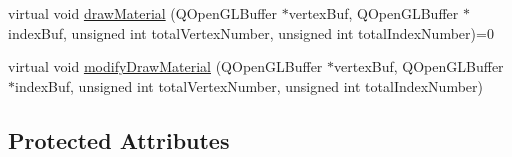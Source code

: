 \begin{DoxyCompactItemize}
\item 
virtual void \mbox{\hyperlink{class_geometry_engine_1_1_geometry_material_1_1_material_a0070eab6e5fe86dc05dc69f2e37b9072}{draw\+Material}} (Q\+Open\+G\+L\+Buffer $\ast$vertex\+Buf, Q\+Open\+G\+L\+Buffer $\ast$index\+Buf, unsigned int total\+Vertex\+Number, unsigned int total\+Index\+Number)=0
\item 
virtual void \mbox{\hyperlink{class_geometry_engine_1_1_geometry_material_1_1_material_a117d066e53b015d834d52b0a5f09f410}{modify\+Draw\+Material}} (Q\+Open\+G\+L\+Buffer $\ast$vertex\+Buf, Q\+Open\+G\+L\+Buffer $\ast$index\+Buf, unsigned int total\+Vertex\+Number, unsigned int total\+Index\+Number)
\end{DoxyCompactItemize}
\subsection*{Protected Attributes}
